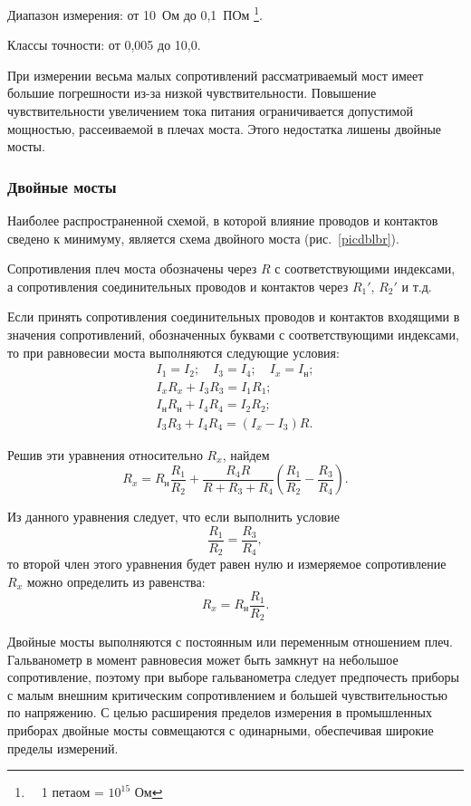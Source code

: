 \documentclass[pscyr]{hedwork}
\newcommand{\Pic}[1]{\ref{pic#1}}
\newcommand{\pic}[1]{рис.~\Pic{#1}}
\begin{document}
  Диапазон измерения: от 10~Ом до 0,1~ПОм%
    \footnote{\ \ 1 петаом = \( 10^{15} \) Ом}.
  
  Классы точности: от 0,005 до 10,0.

  При измерении весьма малых сопротивлений рассматриваемый мост имеет
  большие погрешности из-за низкой чувствительности. Повышение
  чувствительности увеличением тока питания ограничивается допустимой мощностью,
  рассеиваемой в плечах моста. Этого недостатка лишены двойные мосты.

  \subsubsection{Двойные мосты}

  Наиболее распространенной схемой, в которой влияние проводов и контактов
  сведено к минимуму, является схема двойного моста (\pic{dblbr}).
  
  Сопротивления плеч моста обозначены через \( R \) с соответствующими
  индексами, а сопротивления соединительных проводов и контактов через
  \( R_1' \), \( R_2' \) и т.д.
  
  Если принять сопротивления соединительных проводов и контактов входящими в
  значения сопротивлений, обозначенных буквами с соответствующими индексами, то
  при равновесии моста выполняются следующие условия:
  \begin{gather*}
    I_1 = I_2; \quad I_3 = I_4; \quad I_x = I_\text{н}; \\
    I_x R_x + I_3 R_3 = I_1 R_1; \\
    I_\text{н} R_\text{н} + I_4 R_4 = I_2 R_2; \\
    I_3 R_3 + I_4 R_4 = (I_x - I_3) R.
  \end{gather*}

  Решив эти уравнения относительно \( R_x \), найдем
  \[
    R_x = R_\text{н} \frac{R_1}{R_2} + \frac{R_4 R}{R + R_3 + R_4}
      \left( \frac{R_1}{R_2} - \frac{R_3}{R_4} \right).
  \]
  
  Из данного уравнения следует, что если выполнить условие
  \[
    \frac{R_1}{R_2} = \frac{R_3}{R_4},
  \]
  то второй член этого уравнения будет равен нулю и измеряемое сопротивление
  \( R_x \) можно определить из равенства:
  \[
    R_x = R_\text{н} \frac{R_1}{R_2}.
  \]

  Двойные мосты выполняются с постоянным или переменным отношением плеч.
  Гальванометр в момент равновесия может быть замкнут на небольшое
  сопротивление, поэтому при выборе гальванометра следует предпочесть приборы с
  малым внешним критическим сопротивлением и большей чувствительностью
  по напряжению. С целью расширения пределов измерения в промышленных приборах
  двойные мосты совмещаются с одинарными, обеспечивая широкие пределы измерений.
  
\end{document}
